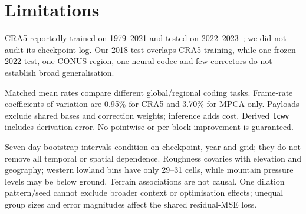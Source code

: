 \section{Limitations}
\label{sec:limitations}

CRA5 reportedly trained on 1979--2021 and tested on 2022--2023~\cite{han2024};
we did not audit its checkpoint log. Our 2018 test overlaps CRA5 training,
while one frozen 2022 test, one CONUS region, one neural codec and few
correctors do not establish broad generalisation.

Matched mean rates compare different global/regional coding tasks. Frame-rate
coefficients of variation are 0.95\% for CRA5 and 3.70\% for MPCA-only.
Payloads exclude shared bases and correction weights; inference adds cost.
Derived \texttt{tcwv} includes derivation error. No pointwise or per-block
improvement is guaranteed.

Seven-day bootstrap intervals condition on checkpoint, year and grid; they do
not remove all temporal or spatial dependence. Roughness covaries with elevation
and geography; western lowland bins have only 29--31 cells, while mountain
pressure levels may be below ground. Terrain associations are not causal.
One dilation pattern/seed cannot exclude broader context or optimisation effects;
unequal group sizes and error magnitudes affect the shared residual-MSE loss.
